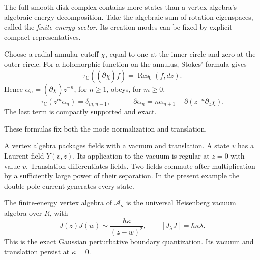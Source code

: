 The full smooth disk complex contains more states than a vertex
algebra's algebraic energy decomposition.
Take the algebraic sum of rotation eigenspaces, called the
\emph{finite-energy sector}.
Its creation modes can be fixed by explicit compact representatives.

Choose a radial annular cutoff \(\chi\), equal to one at the inner
circle and zero at the outer circle. For a holomorphic function on
the annulus, Stokes' formula gives
\[
 \tau_{\mathbb C}((\bar\partial\chi)f)
                  =\operatorname{Res}_0(f,dz).
\]
Hence \(\alpha_n=(\bar\partial\chi)z^{-n}\), for \(n\geq1\), obeys,
for \(m\geq0\),
\[
 \tau_{\mathbb C}(z^m\alpha_n)=\delta_{m,n-1},\qquad
 -\partial\alpha_n=n\alpha_{n+1}
             -\bar\partial(z^{-n}\partial_z\chi).
\]
The last term is compactly supported and exact.

These formulas fix both the mode normalization and translation.

A vertex algebra packages fields with a vacuum and translation.
A state \(v\) has a Laurent field \(Y(v,z)\).
Its application to the vacuum is regular at \(z=0\) with value \(v\).
Translation differentiates fields.
Two fields commute after multiplication by a sufficiently large
power of their separation.
In the present example the double-pole current generates every state.

\begin{theorem}\label{pcsm:heis}
The finite-energy vertex algebra of \(\mathcal A_\kappa\) is the
universal Heisenberg vacuum algebra over \(R\), with
\begin{equation}\label{pcsm:ope}
 J(z)J(w)\sim\frac{\hbar\kappa}{(z-w)^2},
 \qquad [J_\lambda J]=\hbar\kappa\lambda.
\end{equation}
This is the exact Gaussian perturbative boundary quantization.
Its vacuum and translation persist at \(\kappa=0\).
\end{theorem}

